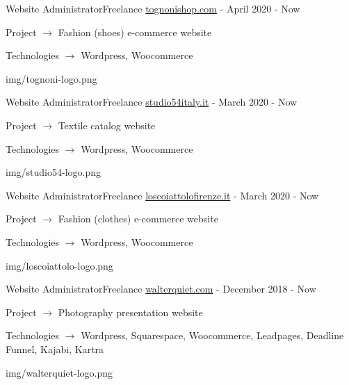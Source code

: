 
\begin{cventries}

  \logocventry
    {Website Administrator{\enskip\cdotp\enskip}Freelance}
    {\href{https://www.tognonishop.com}{tognonishop.com}}
    {-}
    {April 2020 - Now}
    {
      \begin{cvitems}
        \item {Project $\rightarrow$ Fashion (shoes) e-commerce website}
        \item {Technologies $\rightarrow$ Wordpress, Woocommerce}
      \end{cvitems}
    }
    {img/tognoni-logo.png}

  \logocventry
    {Website Administrator{\enskip\cdotp\enskip}Freelance}
    {\href{https://www.studio54italy.it}{studio54italy.it}}
    {-}
    {March 2020 - Now}
    {
      \begin{cvitems}
        \item {Project $\rightarrow$ Textile catalog website}
        \item {Technologies $\rightarrow$ Wordpress, Woocommerce}
      \end{cvitems}
    }
    {img/studio54-logo.png}

  \logocventry
    {Website Administrator{\enskip\cdotp\enskip}Freelance}
    {\href{https://www.loscoiattolofirenze.it}{loscoiattolofirenze.it}}
    {-}
    {March 2020 - Now}
    {
      \begin{cvitems}
        \item {Project $\rightarrow$ Fashion (clothes) e-commerce website}
        \item {Technologies $\rightarrow$ Wordpress, Woocommerce}
      \end{cvitems}
    }
    {img/loscoiattolo-logo.png}

  \logocventry
    {Website Administrator{\enskip\cdotp\enskip}Freelance}
    {\href{https://www.walterquiet.com}{walterquiet.com}}
    {-}
    {December 2018 - Now}
    {
      \begin{cvitems}
        \item {Project $\rightarrow$ Photography presentation website}
        \item {Technologies $\rightarrow$ Wordpress, Squarespace, Woocommerce, Leadpages, Deadline Funnel, Kajabi, Kartra}
      \end{cvitems}
    }
    {img/walterquiet-logo.png}

\end{cventries}
